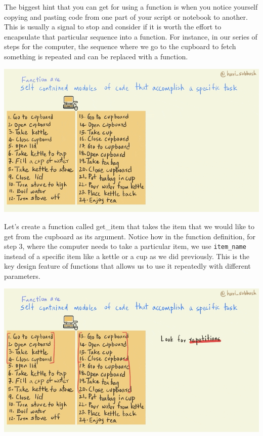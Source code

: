 \documentclass[
]{book}
\begin{document}
The biggest hint that you can get for using a function is when you notice yourself copying and pasting code from one part of your script or notebook to another. This is usually a signal to stop and consider if it is worth the effort to encapsulate that particular sequence into a function. For instance, in our series of steps for the computer, the sequence where we go to the cupboard to fetch something is repeated and can be replaced with a function.

\includegraphics{assets/ch_3-functions/gifs/repetitions.gif}

Let's create a function called get\_item that takes the item that we would like to get from the cupboard as its argument. Notice how in the function definition, for step 3, where the computer needs to take a particular item, we use \texttt{item\_name} instead of a specific item like a kettle or a cup as we did previously. This is the key design feature of functions that allows us to use it repeatedly with different parameters.

\includegraphics{assets/ch_3-functions/gifs/get_item_fn.gif}
\end{document}
